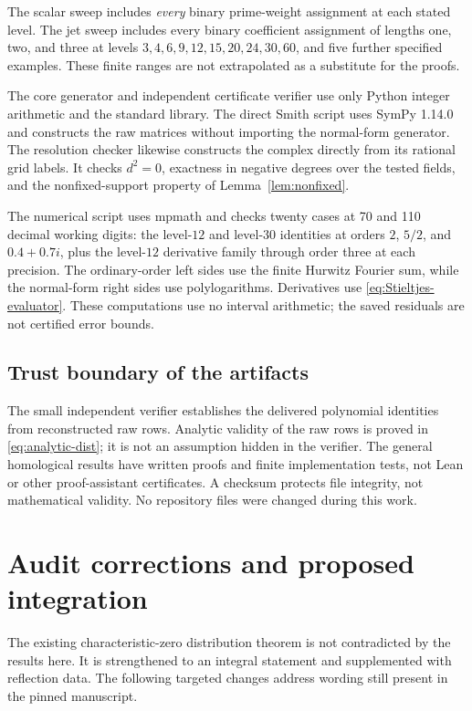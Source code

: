 \documentclass[11pt]{article}
\numberwithin{equation}{section}
\theoremstyle{definition}
\theoremstyle{remark}
\begin{document}
The scalar sweep includes \emph{every} binary prime-weight assignment at
each stated level. The jet sweep includes every binary coefficient
assignment of lengths one, two, and three at levels
$3,4,6,9,12,15,20,24,30,60$, and five further specified examples.
These finite ranges are not extrapolated as a substitute for the proofs.

The core generator and independent certificate verifier use only Python
integer arithmetic and the standard library. The direct Smith script
uses SymPy 1.14.0 and constructs the raw matrices without importing the
normal-form generator. The resolution checker likewise constructs the
complex directly from its rational grid labels. It checks $d^2=0$,
exactness in negative degrees over the tested fields, and the
nonfixed-support property of Lemma~\ref{lem:nonfixed}.

The numerical script uses mpmath and checks twenty cases at 70 and 110
decimal working digits: the level-$12$ and level-$30$ identities at
orders $2$, $5/2$, and $0.4+0.7i$, plus the level-$12$ derivative family
through order three at each precision. The ordinary-order left sides
use the finite Hurwitz Fourier sum, while the normal-form right sides
use polylogarithms. Derivatives use
\eqref{eq:Stieltjes-evaluator}. These computations use no interval
arithmetic; the saved residuals are not certified error bounds.

\subsection{Trust boundary of the artifacts}
The small independent verifier establishes the delivered polynomial
identities from reconstructed raw rows. Analytic validity of the raw
rows is proved in \eqref{eq:analytic-dist}; it is not an assumption
hidden in the verifier. The general homological results have written
proofs and finite implementation tests, not Lean or other
proof-assistant certificates. A checksum protects file integrity, not
mathematical validity. No repository files were changed during this
work.

\section{Audit corrections and proposed integration}
\label{sec:audit}
The existing characteristic-zero distribution theorem is not contradicted
by the results here. It is strengthened to an integral statement and
supplemented with reflection data. The following targeted changes address
wording still present in the pinned manuscript.
\end{document}

